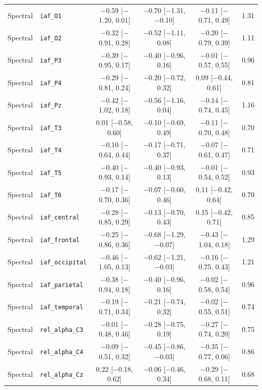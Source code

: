 {\begin{longtable}{llcccc}
Spectral & \texttt{iaf\_O1} & $-$0.59 [$-$1.20, 0.01] & $-$0.70 [$-$1.31, $-$0.10] & $-$0.11 [$-$0.71, 0.49] & 1.31 \\
Spectral & \texttt{iaf\_O2} & $-$0.32 [$-$0.91, 0.28] & $-$0.52 [$-$1.11, 0.08] & $-$0.20 [$-$0.79, 0.39] & 1.11 \\
Spectral & \texttt{iaf\_P3} & $-$0.39 [$-$0.95, 0.17] & $-$0.40 [$-$0.96, 0.16] & $-$0.01 [$-$0.57, 0.55] & 0.96 \\
Spectral & \texttt{iaf\_P4} & $-$0.29 [$-$0.81, 0.24] & $-$0.20 [$-$0.72, 0.32] & 0.09 [$-$0.44, 0.61] & 0.81 \\
Spectral & \texttt{iaf\_Pz} & $-$0.42 [$-$1.02, 0.18] & $-$0.56 [$-$1.16, 0.04] & $-$0.14 [$-$0.74, 0.45] & 1.16 \\
Spectral & \texttt{iaf\_T3} & 0.01 [$-$0.58, 0.60] & $-$0.10 [$-$0.69, 0.49] & $-$0.11 [$-$0.70, 0.48] & 0.70 \\
Spectral & \texttt{iaf\_T4} & $-$0.10 [$-$0.64, 0.44] & $-$0.17 [$-$0.71, 0.37] & $-$0.07 [$-$0.61, 0.47] & 0.71 \\
Spectral & \texttt{iaf\_T5} & $-$0.40 [$-$0.93, 0.14] & $-$0.40 [$-$0.93, 0.13] & $-$0.01 [$-$0.54, 0.52] & 0.93 \\
Spectral & \texttt{iaf\_T6} & $-$0.17 [$-$0.70, 0.36] & $-$0.07 [$-$0.60, 0.46] & 0.11 [$-$0.42, 0.64] & 0.70 \\
Spectral & \texttt{iaf\_central} & $-$0.28 [$-$0.85, 0.29] & $-$0.13 [$-$0.70, 0.43] & 0.15 [$-$0.42, 0.71] & 0.85 \\
Spectral & \texttt{iaf\_frontal} & $-$0.25 [$-$0.86, 0.36] & $-$0.68 [$-$1.29, $-$0.07] & $-$0.43 [$-$1.04, 0.18] & 1.29 \\
Spectral & \texttt{iaf\_occipital} & $-$0.46 [$-$1.05, 0.13] & $-$0.62 [$-$1.21, $-$0.03] & $-$0.16 [$-$0.75, 0.43] & 1.21 \\
Spectral & \texttt{iaf\_parietal} & $-$0.38 [$-$0.94, 0.18] & $-$0.40 [$-$0.96, 0.16] & $-$0.02 [$-$0.58, 0.54] & 0.96 \\
Spectral & \texttt{iaf\_temporal} & $-$0.19 [$-$0.71, 0.34] & $-$0.21 [$-$0.74, 0.32] & $-$0.02 [$-$0.55, 0.51] & 0.74 \\
Spectral & \texttt{rel\_alpha\_C3} & $-$0.01 [$-$0.48, 0.46] & $-$0.28 [$-$0.75, 0.19] & $-$0.27 [$-$0.74, 0.20] & 0.75 \\
Spectral & \texttt{rel\_alpha\_C4} & $-$0.09 [$-$0.51, 0.32] & $-$0.45 [$-$0.86, $-$0.03] & $-$0.35 [$-$0.77, 0.06] & 0.86 \\
Spectral & \texttt{rel\_alpha\_Cz} & 0.22 [$-$0.18, 0.62] & $-$0.06 [$-$0.46, 0.34] & $-$0.29 [$-$0.68, 0.11] & 0.68 \\

\end{longtable}}
